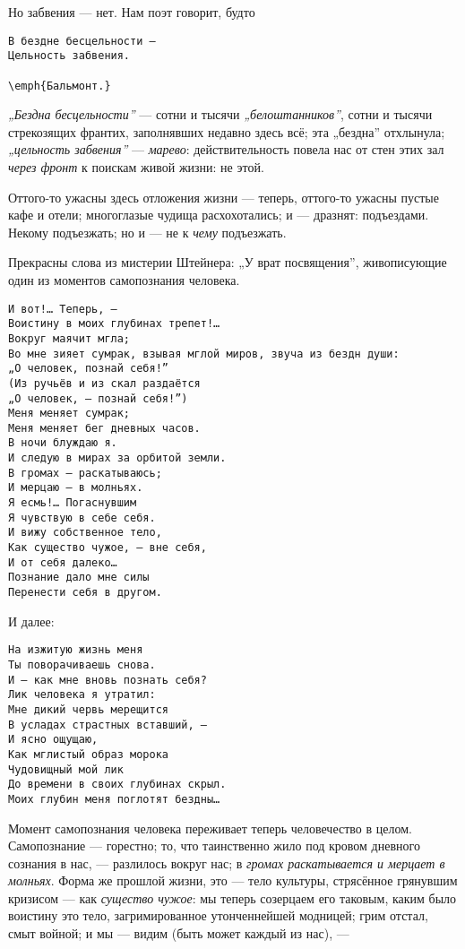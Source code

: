 \documentclass[12pt,a4paper,oneside]{book}
\begin{document}
Но забвения — нет. Нам поэт говорит, будто

\begin{Verbatim}
В бездне бесцельности —
Цельность забвения.
                                                          \emph{Бальмонт.}
\end{Verbatim}

\emph{„Бездна бесцельности”} — сотни и тысячи \emph{„белоштанников”}, сотни и тысячи стрекозящих франтих, заполнявших недавно здесь всё; эта „бездна” отхлынула; \emph{„цельность забвения”} — \emph{марево}: действительность повела нас от стен этих зал \emph{через фронт} к поискам живой жизни: не этой.

Оттого-то ужасны здесь отложения жизни — теперь, оттого-то ужасны пустые кафе и отели; многоглазые чудища расхохотались; и — дразнят: подъездами. Некому подъезжать; но и — не к \emph{чему} подъезжать.

Прекрасны слова из мистерии Штейнера: „У врат посвящения”, живописующие один из моментов самопознания человека.

\begin{Verbatim}
И вот!… Теперь, —
Воистину в моих глубинах трепет!…
Вокруг маячит мгла;
Во мне зияет сумрак, взывая мглой миров, звуча из бездн души:
„О человек, познай себя!”
(Из ручьёв и из скал раздаётся
„О человек, — познай себя!”)
Меня меняет сумрак;
Меня меняет бег дневных часов.
В ночи блуждаю я.
И следую в мирах за орбитой земли.
В громах — раскатываюсь;
И мерцаю — в молньях.
Я есмь!… Погаснувшим
Я чувствую в себе себя.
И вижу собственное тело,
Как существо чужое, — вне себя,
И от себя далеко…
Познание дало мне силы
Перенести себя в другом.
\end{Verbatim}

И далее:
\begin{Verbatim}
На изжитую жизнь меня
Ты поворачиваешь снова.
И — как мне вновь познать себя?
Лик человека я утратил:
Мне дикий червь мерещится
В усладах страстных вставший, —
И ясно ощущаю,
Как мглистый образ морока
Чудовищный мой лик
До времени в своих глубинах скрыл.
Моих глубин меня поглотят бездны…
\end{Verbatim}

Момент самопознания человека переживает теперь человечество в целом. Самопознание — горестно; то, что таинственно жило под кровом дневного сознания в нас, — разлилось вокруг нас; в \emph{громах раскатывается и мерцает в молньях}. Форма же прошлой жизни, это — тело культуры, стрясённое грянувшим кризисом — как \emph{существо чужое}: мы теперь созерцаем его таковым, каким было воистину это тело, загримированное утонченнейшей модницей; грим отстал, смыт войной; и мы — видим (быть может каждый из нас), —
\end{document}
